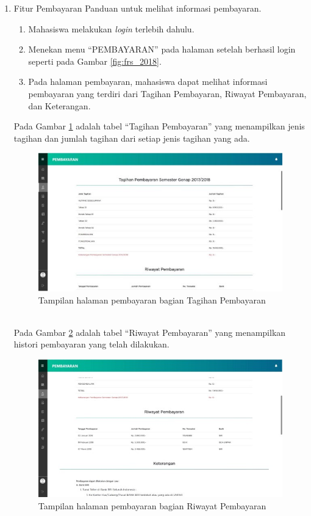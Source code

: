 \begin{enumerate}
	\item Fitur Pembayaran
	Panduan untuk melihat informasi pembayaran.
	\begin{enumerate}
		\item Mahasiswa melakukan \textit{login} terlebih dahulu. 
		\item Menekan menu ``PEMBAYARAN'' pada halaman setelah berhasil login seperti pada Gambar \ref{fig:frs_2018}. 
		\item Pada halaman pembayaran, mahasiswa dapat melihat informasi pembayaran yang terdiri dari Tagihan Pembayaran, Riwayat Pembayaran, dan Keterangan.
	\end{enumerate}
	Pada Gambar \ref{fig:bayar_2018} adalah tabel ``Tagihan Pembayaran'' yang menampilkan jenis tagihan dan jumlah tagihan dari setiap jenis tagihan yang ada.
	\begin{figure}[H]
		\centering
		\includegraphics[scale=0.7]{Gambar/bayar2018.jpg}
		\caption{Tampilan halaman pembayaran bagian Tagihan Pembayaran} 
		\label{fig:bayar_2018}
	\end{figure}\\
	
	Pada Gambar \ref{fig:riw_2018} adalah tabel ``Riwayat Pembayaran'' yang menampilkan histori pembayaran yang telah dilakukan.
	\begin{figure}[H]
		\centering
		\includegraphics[scale=0.7]{Gambar/riwayat2018.jpg}
		\caption{Tampilan halaman pembayaran bagian Riwayat Pembayaran} 
		\label{fig:riw_2018}
	\end{figure}\\
	

\end{enumerate}
